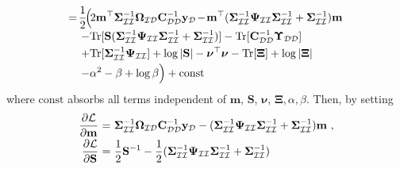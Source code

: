 \documentclass[conference]{IEEEtran}
\begin{document}
\begin{equation*}
\begin{array}{l}
			\displaystyle\hspace{-0.5mm}=\hspace{-0.5mm} \dfrac{1}{2}\hspace{-0.5mm}\Big(\hspace{-0.5mm}2\mathbf{m}^\top\mathbf{\Sigma}_\mathcal{II}^{-1}\mathbf{\Omega}_\mathcal{ID}\mathbf{C}_\mathcal{DD}^{-1}\mathbf{y}_\mathcal{D}\hspace{-0.5mm}-\hspace{-0.5mm}\mathbf{m}^\top(\mathbf{\Sigma}_\mathcal{II}^{-1}\mathbf{\Psi}_\mathcal{II}\mathbf{\Sigma}_\mathcal{II}^{-1}+\mathbf{\Sigma}_\mathcal{II}^{-1})\mathbf{m}\vspace{0.5mm}\\
			\displaystyle\quad-\mathrm{Tr}[\mathbf{S}(\mathbf{\Sigma}_\mathcal{II}^{-1}\mathbf{\Psi}_\mathcal{II}\mathbf{\Sigma}_\mathcal{II}^{-1}+ \mathbf{\Sigma}_\mathcal{II}^{-1})]-\mathrm{Tr}[\mathbf{C}_\mathcal{DD}^{-1}\mathbf{\Upsilon}_\mathcal{DD}]\vspace{1mm}\\
			\displaystyle\quad+\mathrm{Tr}[\mathbf{\Sigma}_\mathcal{II}^{-1}\mathbf{\Psi}_\mathcal{II}]+\log|\mathbf{S}|-\boldsymbol{\nu}^\top\boldsymbol{\nu}-\mathrm{Tr}[\mathbf{\Xi}]+\log|\mathbf{\Xi}|\vspace{1mm}\\
			\displaystyle\quad-\alpha^2-\beta
			+\log \beta\Big)+ \mathrm{const}
		\end{array}
	\end{equation*}
	where $\mathrm{const}$ absorbs all terms independent of $\mathbf{m}$, $\mathbf{S}$, $\boldsymbol{\nu}$, $\mathbf{\Xi},\alpha,\beta$.
	Then, by setting
	\vspace{-1mm}
	\begin{equation*}
		\begin{array}{rcl}
			\dfrac{\partial\mathcal{L}}{\partial\mathbf{m}}&\hspace{-2.4mm}=&\hspace{-2.4mm}\displaystyle\mathbf{\Sigma}_\mathcal{II}^{-1}\mathbf{\Omega}_\mathcal{ID}\mathbf{C}_\mathcal{DD}^{-1}\mathbf{y}_\mathcal{D}-(\mathbf{\Sigma}_\mathcal{II}^{-1}\mathbf{\Psi}_\mathcal{II}\mathbf{\Sigma}_\mathcal{II}^{-1}+\mathbf{\Sigma}_\mathcal{II}^{-1})\mathbf{m}\ ,\vspace{1mm} \\
			\dfrac{\partial\mathcal{L}}{\partial\mathbf{S}}&\hspace{-2.4mm}=&\hspace{-2.4mm}\displaystyle\dfrac{1}{2}\mathbf{S}^{-1}-\dfrac{1}{2}(\mathbf{\Sigma}_\mathcal{II}^{-1}\mathbf{\Psi}_\mathcal{II}\mathbf{\Sigma}_\mathcal{II}^{-1}+\mathbf{\Sigma}_\mathcal{II}^{-1})
		\end{array}\vspace{0mm}
	\end{equation*}
\end{document}
